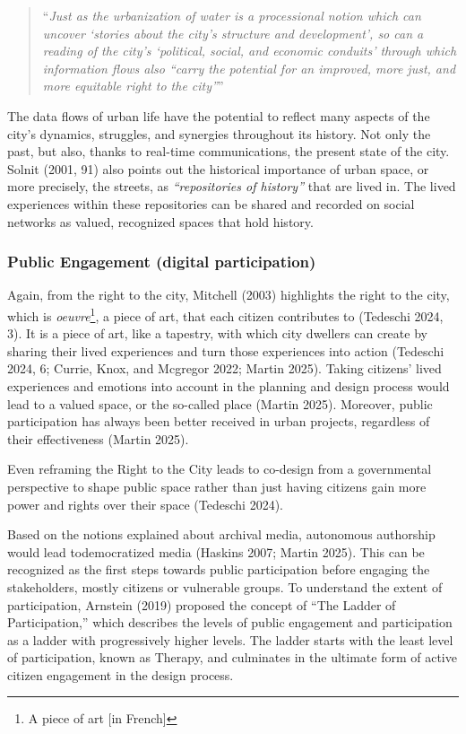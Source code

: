 \documentclass[
  letterpaper,
  DIV=11,
  numbers=noendperiod]{scrartcl}
\begin{document}
\begin{quote}
``\emph{Just as the urbanization of water is a processional notion which
can uncover `stories about the city's structure and development', so can
a reading of the city's `political, social, and economic conduits'
through which information flows also ``carry the potential for an
improved, more just, and more equitable right to the city''}''
\end{quote}

The data flows of urban life have the potential to reflect many aspects
of the city's dynamics, struggles, and synergies throughout its history.
Not only the past, but also, thanks to real-time communications, the
present state of the city. Solnit (2001, 91) also points out the
historical importance of urban space, or more precisely, the streets, as
\emph{``repositories of history''} that are lived in. The lived
experiences within these repositories can be shared and recorded on
social networks as valued, recognized spaces that hold history.

\subsubsection{Public Engagement (digital
participation)}\label{public-engagement-digital-participation}

Again, from the right to the city, Mitchell (2003) highlights the right
to the city, which is \emph{oeuvre}\footnote{A piece of art {[}in
  French{]}}, a piece of art, that each citizen contributes to (Tedeschi
2024, 3). It is a piece of art, like a tapestry, with which city
dwellers can create by sharing their lived experiences and turn those
experiences into action (Tedeschi 2024, 6; Currie, Knox, and Mcgregor
2022; Martin 2025). Taking citizens' lived experiences and emotions into
account in the planning and design process would lead to a valued space,
or the so-called place (Martin 2025). Moreover, public participation has
always been better received in urban projects, regardless of their
effectiveness (Martin 2025).

Even reframing the Right to the City leads to co-design from a
governmental perspective to shape public space rather than just having
citizens gain more power and rights over their space (Tedeschi 2024).

Based on the notions explained about archival media, autonomous
authorship would lead todemocratized media (Haskins 2007; Martin 2025).
This can be recognized as the first steps towards public participation
before engaging the stakeholders, mostly citizens or vulnerable groups.
To understand the extent of participation, Arnstein (2019) proposed the
concept of ``The Ladder of Participation,'' which describes the levels
of public engagement and participation as a ladder with progressively
higher levels. The ladder starts with the least level of participation,
known as Therapy, and culminates in the ultimate form of active citizen
engagement in the design process.
\end{document}
